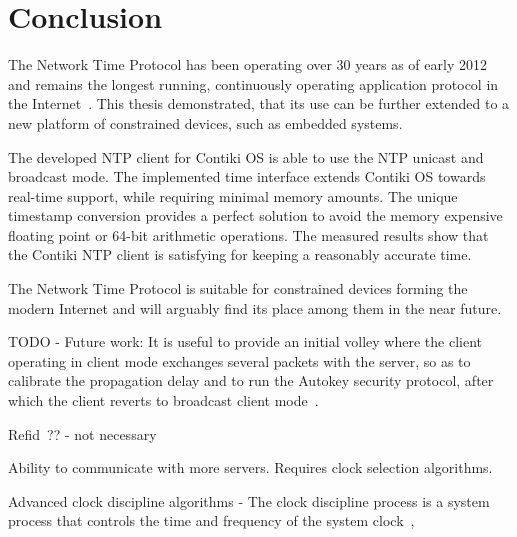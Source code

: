 





\chapter{Conclusion}
The Network Time Protocol has been operating over 30 years as of early 2012
and remains the longest running, continuously operating application
protocol in the Internet~\cite{ntp-y2k}.
This thesis demonstrated, that its use can be further extended to a new platform of constrained devices,
such as embedded systems.

The developed NTP client for Contiki OS is able to use the NTP unicast and broadcast mode.
The implemented time interface extends Contiki OS towards real-time support,
while requiring minimal memory amounts.
The unique timestamp conversion provides a perfect solution to avoid the
memory expensive floating point or 64-bit arithmetic operations.
The measured results show that the Contiki NTP client is satisfying for keeping a reasonably accurate time.

The Network Time Protocol is suitable for constrained devices
forming the modern Internet and will arguably find its place among them in the near future.





TODO - Future work:
It is useful to provide an initial volley where the client operating in
client mode exchanges several packets with the server, so as to
calibrate the propagation delay and to run the Autokey security
protocol, after which the client reverts to broadcast client mode~\cite{rfc5905}.

Refid~\cite{rfc5905}?? - not necessary

Ability to communicate with more servers. Requires clock selection algorithms.

Advanced clock discipline algorithms -
The clock discipline process is a system process that controls the
time and frequency of the system clock~\cite{rfc5905},




